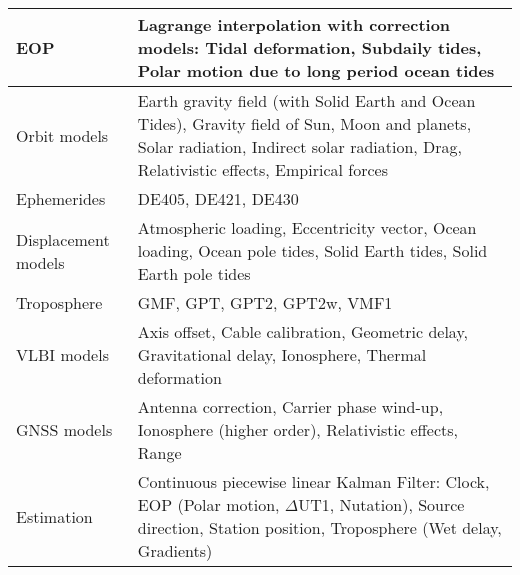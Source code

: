 \color{black}
\begin{tabularx}{\columnwidth}{l|X}
  EOP & Lagrange interpolation with correction models: Tidal deformation,
  Subdaily tides, Polar motion due to long period ocean tides \\
  \hline
  Orbit models & Earth gravity field (with Solid Earth and Ocean Tides),
  Gravity field of Sun, Moon and planets, Solar radiation, Indirect solar radiation,
  Drag, Relativistic effects, Empirical forces \\
  \hline
  Ephemerides & DE405, DE421, DE430 \\
  \hline
  Displacement models & Atmospheric loading, Eccentricity vector, Ocean loading,
  Ocean pole tides, Solid Earth tides, Solid Earth pole tides \\
  \hline
  Troposphere & GMF, GPT, GPT2, GPT2w, VMF1 \\
  \hline
  VLBI models & Axis offset, Cable calibration, Geometric delay, Gravitational
  delay, Ionosphere, Thermal deformation \\
  \hline
  GNSS models & Antenna correction, Carrier phase wind-up, Ionosphere (higher
  order), Relativistic effects, Range \\
  \hline
  Estimation & Continuous piecewise linear Kalman Filter: Clock, EOP (Polar
  motion, $\Delta$UT1, Nutation), Source direction, Station position, Troposphere
  (Wet delay, Gradients)
\end{tabularx}

\endinput
